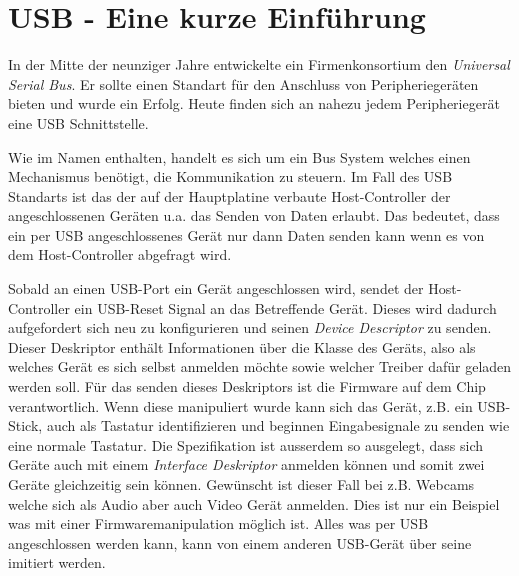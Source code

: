 \section{USB - Eine kurze Einführung}
In der Mitte der neunziger Jahre entwickelte ein Firmenkonsortium den \textit{Universal Serial Bus}.
Er sollte einen Standart für den Anschluss von Peripheriegeräten bieten und wurde ein Erfolg.
Heute finden sich an nahezu jedem Peripheriegerät eine USB Schnittstelle.

Wie im Namen enthalten, handelt es sich um ein Bus System welches einen Mechanismus benötigt, die Kommunikation zu steuern.
Im Fall des USB Standarts ist das der auf der Hauptplatine verbaute Host-Controller der angeschlossenen Geräten u.a. das Senden von Daten erlaubt.
Das bedeutet, dass ein per USB angeschlossenes Gerät nur dann Daten senden kann wenn es von dem Host-Controller abgefragt wird.

Sobald an einen USB-Port ein Gerät angeschlossen wird, sendet der Host-Controller ein USB-Reset Signal an das Betreffende Gerät.
Dieses wird dadurch aufgefordert sich neu zu konfigurieren und seinen \textit{Device Descriptor} zu senden.
Dieser Deskriptor enthält Informationen über die Klasse des Geräts, also als welches Gerät es sich selbst anmelden möchte sowie welcher Treiber dafür geladen werden soll.
Für das senden dieses Deskriptors ist die Firmware auf dem Chip verantwortlich.
Wenn diese manipuliert wurde kann sich das Gerät, z.B. ein USB-Stick, auch als Tastatur identifizieren und beginnen Eingabesignale zu senden wie eine normale Tastatur.
Die Spezifikation ist ausserdem so ausgelegt, dass sich Geräte auch mit einem \textit{Interface Deskriptor} anmelden können und somit zwei Geräte gleichzeitig sein können.
Gewünscht ist dieser Fall bei z.B. Webcams welche sich als Audio aber auch Video Gerät anmelden.
Dies ist nur ein Beispiel was mit einer Firmwaremanipulation möglich ist.
Alles was per USB angeschlossen werden kann, kann von einem anderen USB-Gerät über seine imitiert werden.
